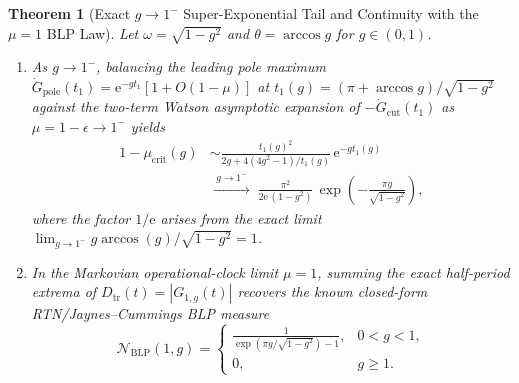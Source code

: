 \documentclass[twocolumn,10pt,amsmath,amssymb,floatfix]{revtex4-2}
\theoremstyle{plain}
\newtheorem{theorem}{Theorem}
\theoremstyle{definition}
\newcommand{\ee}{\mathrm{e}}
\newcommand{\NBLP}{\mathcal{N}_{\mathrm{BLP}}}
\newcommand{\mucrit}{\mu_{\mathrm{crit}}}
\begin{document}
\begin{theorem}[Exact $g \to 1^-$ Super-Exponential Tail and Continuity with the $\mu = 1$ BLP Law]
\label{thm:asymptotic_and_mu1}
Let $\omega = \sqrt{1 - g^2}$ and $\theta = \arccos g$ for $g \in (0,1)$.
\begin{enumerate}[label=(\alph*),leftmargin=1.5em,itemsep=2pt]
\item As $g \to 1^-$, balancing the leading pole maximum $\dot{G}_{\mathrm{pole}}(t_1) = \ee^{-g t_1}[1 + O(1-\mu)]$ at $t_1(g) = (\pi + \arccos g)/\sqrt{1 - g^2}$ against the two-term Watson asymptotic expansion of $-\dot{G}_{\mathrm{cut}}(t_1)$ as $\mu = 1 - \epsilon \to 1^-$ yields
\begin{align}
\label{eq:asymp_law}
1 - \mucrit(g) &\sim \frac{t_1(g)^2}{2g + 4(4g^2 - 1)/t_1(g)}\,\ee^{-g t_1(g)} \nonumber\\
&\xrightarrow{\;g \to 1^-\;}\;
\frac{\pi^2}{2\ee\,(1 - g^2)}\,\exp\!\left(-\frac{\pi g}{\sqrt{1 - g^2}}\right),
\end{align}
where the factor $1/\ee$ arises from the exact limit $\lim_{g \to 1^-} g\arccos(g)/\sqrt{1 - g^2} = 1$.
\item In the Markovian operational-clock limit $\mu = 1$, summing the exact half-period extrema of $D_{\mathrm{tr}}(t) = |G_{1,g}(t)|$ recovers the known closed-form RTN/Jaynes--Cummings BLP measure~\cite{Addis2014PRA}
\begin{equation}
\label{eq:mu1_nblp}
\NBLP(1, g) = \begin{cases}
\displaystyle\frac{1}{\exp\!\left(\pi g / \sqrt{1 - g^2}\right) - 1}, & 0 < g < 1, \\[10pt]
0, & g \ge 1.
\end{cases}
\end{equation}
\end{enumerate}
\end{theorem}
\end{document}
